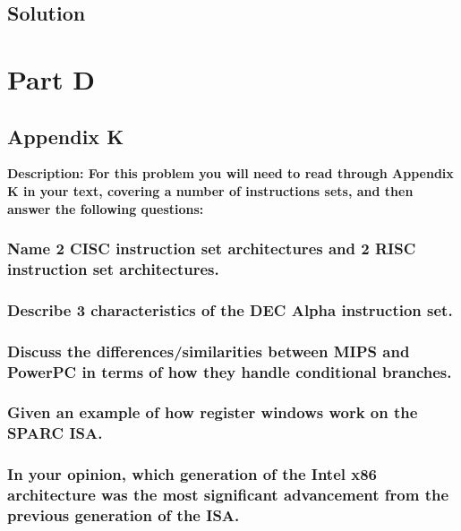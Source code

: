 \breakrule

\subsection{Solution}

\newpage



\section{Part D}

\subsection{Appendix K}
\textbf{Description: For	this	problem	you	will	need	to	read	through	Appendix	K	in	your	text,	covering	a	
number	of	instructions	sets,	and	then	answer	the	following	questions:}
\subsubsection{Name	2	CISC	instruction	set	architectures	and	2	RISC	instruction	set	
architectures.}
\subsubsection{Describe	3	characteristics	of	the	DEC	Alpha instruction	set.}
\subsubsection{Discuss	the	differences/similarities	between	MIPS	and	PowerPC	in	terms	of	
how	they	handle	conditional	branches.}
\subsubsection{Given	an	example	of	how	register	windows	work	on	the	SPARC	ISA.}
\subsubsection{In	your	opinion,	which	generation	of	the	Intel	x86	architecture	was	the	most	
significant	advancement	from	the	previous	generation	of	the	ISA.}

